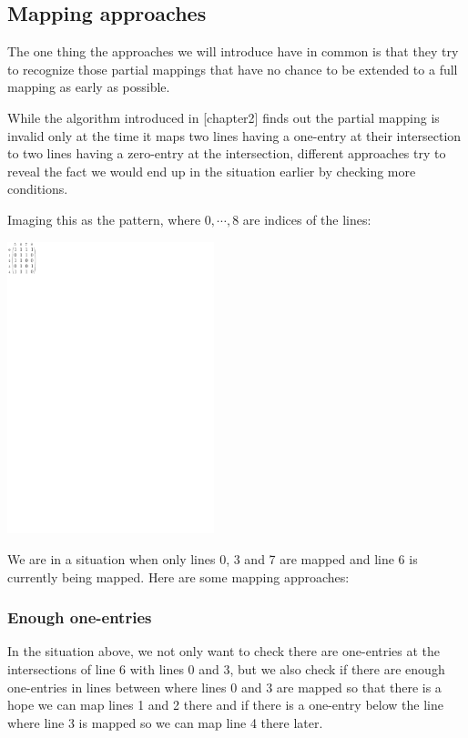 \subsection{Mapping approaches}
The one thing the approaches we will introduce have in common is that they try to recognize those partial mappings that have no chance to be extended to a full mapping as early as possible.

While the algorithm introduced in [chapter2] finds out the partial mapping is invalid only at the time it maps two lines having a one-entry at their intersection to two lines having a zero-entry at the intersection, different approaches try to reveal the fact we would end up in the situation earlier by checking more conditions.

Imaging this as the pattern, where $0,\cdots,8$ are indices of the lines:

\centerline{\mbox{\includegraphics[width=60mm]{../img/approaches.pdf}}}

We are in a situation when only lines 0, 3 and 7 are mapped and line 6 is currently being mapped. Here are some mapping approaches:
\subsubsection{Enough one-entries}
In the situation above, we not only want to check there are one-entries at the intersections of line 6 with lines 0 and 3, but we also check if there are enough one-entries in lines between where lines 0 and 3 are mapped so that there is a hope we can map lines 1 and 2 there and if there is a one-entry below the line where line 3 is mapped so we can map line 4 there later.

